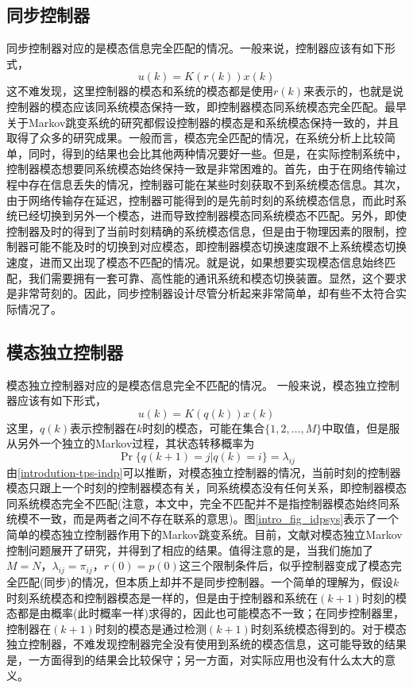 	\subsection{同步控制器}
	同步控制器对应的是模态信息完全匹配的情况。一般来说，控制器应该有如下形式，
	\begin{equation}
		u(k)=K(r(k))x(k)
	\end{equation}
	这不难发现，这里控制器的模态和系统的模态都是使用$r(k)$来表示的，也就是说控制器的模态应该同系统模态保持一致，即控制器模态同系统模态完全匹配。最早关于Markov跳变系统的研究都假设控制器的模态是和系统模态保持一致的，并且取得了众多的研究成果。一般而言，模态完全匹配的情况，在系统分析上比较简单，同时，得到的结果也会比其他两种情况要好一些。但是，在实际控制系统中，控制器模态想要同系统模态始终保持一致是非常困难的。首先，由于在网络传输过程中存在信息丢失的情况，控制器可能在某些时刻获取不到系统模态信息。其次，由于网络传输存在延迟，控制器可能得到的是先前时刻的系统模态信息，而此时系统已经切换到另外一个模态，进而导致控制器模态同系统模态不匹配。另外，即使控制器及时的得到了当前时刻精确的系统模态信息，但是由于物理因素的限制，控制器可能不能及时的切换到对应模态，即控制器模态切换速度跟不上系统模态切换速度，进而又出现了模态不匹配的情况。就是说，如果想要实现模态信息始终匹配，我们需要拥有一套可靠、高性能的通讯系统和模态切换装置。显然，这个要求是非常苛刻的。因此，同步控制器设计尽管分析起来非常简单，却有些不太符合实际情况了。
	
	\subsection{模态独立控制器}
	模态独立控制器对应的是模态信息完全不匹配的情况。 一般来说，模态独立控制器应该有如下形式，
	\begin{equation}
	u(k)=K(q(k))x(k)
	\end{equation}
	这里，$q(k)$表示控制器在$k$时刻的模态，可能在集合$\{1,2,\dots,M \}$中取值，但是服从另外一个独立的Markov过程，其状态转移概率为
	\begin{equation}\label{introdution-tps-indp} 
	\Pr\{q(k+1)=j|q(k)=i \}=\lambda_{ij}
	\end{equation}
	由\eqref{introdution-tps-indp}可以推断，对模态独立控制器的情况，当前时刻的控制器模态只跟上一个时刻的控制器模态有关，同系统模态没有任何关系，即控制器模态同系统模态完全不匹配(注意，本文中，完全不匹配并不是指控制器模态始终同系统模不一致，而是两者之间不存在联系的意思)。图\ref{intro_fig_idpsys}表示了一个简单的模态独立控制器作用下的Markov跳变系统。目前，文献\cite{todorov2016new,wu2005mode,dolgov2017static}对模态独立Markov控制问题展开了研究，并得到了相应的结果。值得注意的是，当我们施加了$M=N$，$\lambda_{ij}=\pi_{ij}$，$r(0)=p(0)$这三个限制条件后，似乎控制器变成了模态完全匹配(同步)的情况，但本质上却并不是同步控制器。一个简单的理解为，假设$k$时刻系统模态和控制器模态是一样的，但是由于控制器和系统在$(k+1)$时刻的模态都是由概率(此时概率一样)求得的，因此也可能模态不一致；在同步控制器里，控制器在$(k+1)$时刻的模态是通过检测$(k+1)$时刻系统模态得到的。对于模态独立控制器，不难发现控制器完全没有使用到系统的模态信息，这可能导致的结果是，一方面得到的结果会比较保守；另一方面，对实际应用也没有什么太大的意义。
	
